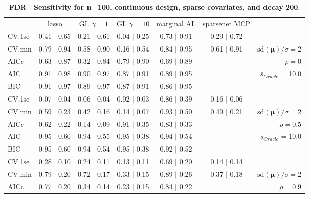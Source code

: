 \clearpage
\begin{table}\vspace{-.5cm}
\caption[l]{ {\it }
{ \bf FDR $\boldsymbol{\mid}$ Sensitivity for n=100, continuous design, sparse covariates, and  decay  200}.}
\vspace{-.5cm}
\footnotesize{}
\begin{center}
\begin{tabular}{l*{5}{c}|r}
 & lasso & GL $\gamma=1$ & GL $\gamma=10$ & marginal AL & sparsenet MCP  & \\
 \cline{1-7}
CV.1se & 0.41 $\mid$ 0.65 & 0.21 $\mid$ 0.61 & 0.04 $\mid$ 0.25 & 0.73 $\mid$ 0.91 & 0.29 $\mid$ 0.72 & \\
CV.min & 0.79 $\mid$ 0.94 & 0.58 $\mid$ 0.90 & 0.16 $\mid$ 0.54 & 0.84 $\mid$ 0.95 & 0.61 $\mid$ 0.91 &  $\mathrm{sd}(\mathbf{\mu})/\sigma=2$ \\
AICc & 0.63 $\mid$ 0.87 & 0.32 $\mid$ 0.84 & 0.79 $\mid$ 0.90 & 0.69 $\mid$ 0.89 & & $\rho=0$ \\
AIC & 0.91 $\mid$ 0.98 & 0.90 $\mid$ 0.97 & 0.87 $\mid$ 0.91 & 0.89 $\mid$ 0.95 & &  \multirow{2}{*}{$\bar{s}_{Oracle}$ = 10.0} \\
BIC & 0.91 $\mid$ 0.97 & 0.89 $\mid$ 0.97 & 0.87 $\mid$ 0.91 & 0.86 $\mid$ 0.95 & &  \\
 \hline 
CV.1se & 0.07 $\mid$ 0.04 & 0.06 $\mid$ 0.04 & 0.02 $\mid$ 0.03 & 0.86 $\mid$ 0.39 & 0.16 $\mid$ 0.06 & \\
CV.min & 0.59 $\mid$ 0.23 & 0.42 $\mid$ 0.16 & 0.14 $\mid$ 0.07 & 0.93 $\mid$ 0.50 & 0.49 $\mid$ 0.21 &  $\mathrm{sd}(\mathbf{\mu})/\sigma=2$ \\
AICc & 0.62 $\mid$ 0.22 & 0.14 $\mid$ 0.09 & 0.91 $\mid$ 0.35 & 0.83 $\mid$ 0.33 & & $\rho=0.5$ \\
AIC & 0.95 $\mid$ 0.60 & 0.94 $\mid$ 0.55 & 0.95 $\mid$ 0.38 & 0.94 $\mid$ 0.54 & &  \multirow{2}{*}{$\bar{s}_{Oracle}$ = 10.0} \\
BIC & 0.95 $\mid$ 0.60 & 0.94 $\mid$ 0.54 & 0.95 $\mid$ 0.38 & 0.92 $\mid$ 0.52 & &  \\
 \hline 
CV.1se & 0.28 $\mid$ 0.10 & 0.24 $\mid$ 0.11 & 0.13 $\mid$ 0.11 & 0.69 $\mid$ 0.20 & 0.14 $\mid$ 0.14 & \\
CV.min & 0.79 $\mid$ 0.20 & 0.72 $\mid$ 0.17 & 0.33 $\mid$ 0.15 & 0.89 $\mid$ 0.26 & 0.37 $\mid$ 0.18 &  $\mathrm{sd}(\mathbf{\mu})/\sigma=2$ \\
AICc & 0.77 $\mid$ 0.20 & 0.34 $\mid$ 0.14 & 0.23 $\mid$ 0.15 & 0.84 $\mid$ 0.22 & & $\rho=0.9$ \\

\end{tabular}
\end{center}
\end{table}
